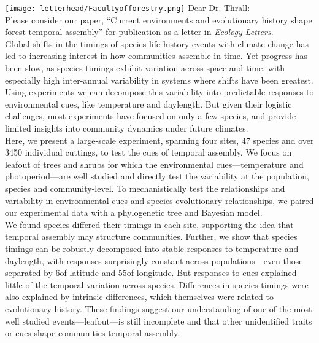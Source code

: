 \documentclass[11pt,a4paper]{article}
\begin{document}

\noindent \texttt{[image: letterhead/Facultyofforestry.png]}
\noindent Dear Dr. Thrall:
\vspace{1.5ex}\\
\noindent Please consider our paper, ``Current environments and evolutionary history shape forest temporal assembly'' for publication as a letter in \emph{Ecology Letters}. 
\vspace{1.5ex}\\ 
Global shifts in the timings of species life history events with climate change has led to increasing interest in how communities assemble in time. Yet progress has been slow, as species timings exhibit variation across space and time, with especially high inter-annual variability in systems where shifts have been greatest. Using experiments we can decompose this variability into predictable responses to environmental cues, like temperature and daylength. But given their logistic challenges, most experiments have focused on only a few species, and provide limited insights into community dynamics under future climates. %
\vspace{1.5ex}\\
\noindent 
Here, we present a large-scale experiment, spanning four sites, 47 species and over 3450 individual cuttings, to test the cues of temporal assembly.  We focus on leafout of trees and shrubs for which the environmental cues---temperature and photoperiod---are well studied and directly test the variability at the population, species and community-level. To mechanistically test the relationships and variability in environmental cues and species evolutionary relationships, we paired our experimental data with a phylogenetic tree and Bayesian model. 
\vspace{1.5 ex}\\
\noindent  We found species differed their timings in each site, supporting the idea that temporal assembly may structure communities. Further, we show that species timings can be robustly decomposed into stable responses to temperature and daylength, with responses surprisingly constant across populations---even those separated by 6\textdegree  of latitude and 55\textdegree  of longitude. But responses to cues explained little of the temporal variation across species. Differences in species timings were also explained by intrinsic differences, which themselves were related to evolutionary history. These findings suggest our understanding of one of the most well studied events---leafout---is still incomplete and that other unidentified traits or cues shape communities temporal assembly. 
\end{document}
